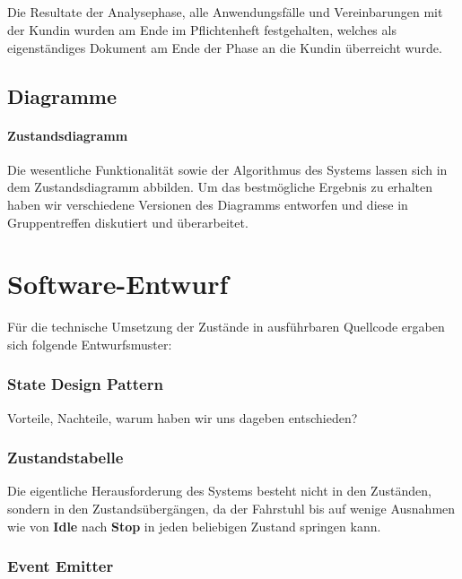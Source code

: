 \paragraph*{}Die Resultate der Analysephase, alle Anwendungsfälle und Vereinbarungen mit der Kundin wurden am Ende im Pflichtenheft festgehalten, welches als eigenständiges Dokument am Ende der Phase an die Kundin überreicht wurde. 
\section{Diagramme}
\subsubsection{Zustandsdiagramm}
Die wesentliche Funktionalität sowie der Algorithmus des Systems lassen sich in
dem Zustandsdiagramm abbilden. Um das bestmögliche Ergebnis zu erhalten haben
wir verschiedene Versionen des Diagramms entworfen und diese in Gruppentreffen diskutiert und überarbeitet.


\chapter{Software-Entwurf}
Für die technische Umsetzung der Zustände in ausführbaren Quellcode ergaben sich folgende Entwurfsmuster:
\subsection*{State Design Pattern}
Vorteile, Nachteile, warum haben wir uns dageben entschieden?
\subsection*{Zustandstabelle}

Die eigentliche Herausforderung des Systems besteht nicht in den Zuständen, sondern in den Zustandsübergängen, da der Fahrstuhl bis auf wenige Ausnahmen wie von \textbf{Idle} nach \textbf{Stop} in jeden beliebigen Zustand springen kann.
\subsection*{Event Emitter}
